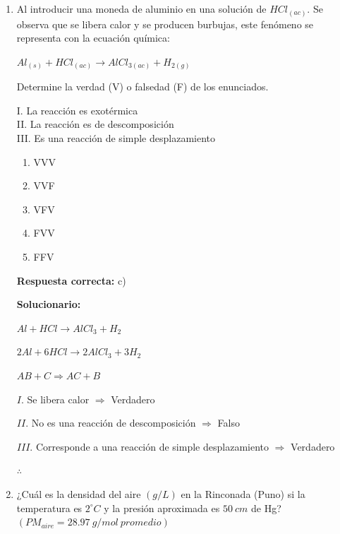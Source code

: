 \begin{enumerate}[resume]
	\vspace{2mm}
	\textbf{Solucionario:}
	
	$^A_Z E+\,_0 n^1 \rightarrow\, _{79}Au^{198}+_1 H^1$
	
	$\Sigma Z=Z+0=79+1$
	
	
	\vspace{6mm}
	
	\item Al introducir una moneda de aluminio en una solución de $HCl_{(ac)}$. Se observa que se libera calor y se producen burbujas, este fenómeno se representa con la ecuación química:
	
	$Al_{(s)}+HCl_{(ac)}\rightarrow AlCl_{3(ac)}+H_{2(g)}$
	
	Determine la verdad (V) o falsedad (F) de los enunciados.
	
	I. La reacción es exotérmica\\
	II. La reacción es de descomposición\\
	III. Es una reacción de simple desplazamiento
	
	\begin{enumerate}[label=\alph*)]
		\item VVV
		\item VVF
		\item VFV
		\item FVV
		\item FFV
	\end{enumerate}
	\textbf{Respuesta correcta:} c)
	
	\vspace{2mm}
	\textbf{Solucionario:}
	
	$Al+HCl\rightarrow AlCl_3+H_2$
	
	$2Al+6HCl\rightarrow 2AlCl_3+3H_2$
	
	$AB+C\Rightarrow AC+B$
	
	$I.$ Se libera calor $\Rightarrow$ Verdadero
	
	$II.$ No es una reacción de descomposición $\Rightarrow$ Falso
	
	$III.$ Corresponde a una reacción de simple desplazamiento $\Rightarrow$ Verdadero
	
	$\therefore$ 
	
	\vspace{6mm}
	
	\item ¿Cuál es la densidad del aire $(g/L)$ en la Rinconada (Puno) si la temperatura es $2^\circ C$ y la presión aproximada es $50\ cm$ de Hg? $(PM_{aire}=28.97\ g/mol\ promedio)$
	

\end{enumerate}
